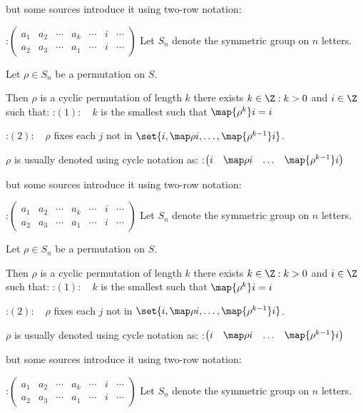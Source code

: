 but some sources introduce it using two-row notation:

:$\begin{pmatrix} a_1 & a_2 & \cdots & a_k & \cdots & i & \cdots \\ a_2 & a_3 & \cdots & a_1 & \cdots & i & \cdots \end{pmatrix}$
Let $S_n$ denote the symmetric group on $n$ letters.

Let $\rho \in S_n$ be a permutation on $S$.


Then $\rho$ is a cyclic permutation of length $k$  there exists $k \in \Z: k > 0$ and $i \in \Z$ such that:
:$(1): \quad k$ is the smallest such that $\map {\rho^k} i = i$

:$(2): \quad \rho$ fixes each $j$ not in $\set {i, \map \rho i, \ldots, \map {\rho^{k - 1} } i}$.


$\rho$ is usually denoted using cycle notation as:
:$\begin{pmatrix} i & \map \rho i & \ldots & \map {\rho^{k - 1} } i \end{pmatrix}$

but some sources introduce it using two-row notation:

:$\begin{pmatrix} a_1 & a_2 & \cdots & a_k & \cdots & i & \cdots \\ a_2 & a_3 & \cdots & a_1 & \cdots & i & \cdots \end{pmatrix}$
Let $S_n$ denote the symmetric group on $n$ letters.

Let $\rho \in S_n$ be a permutation on $S$.


Then $\rho$ is a cyclic permutation of length $k$  there exists $k \in \Z: k > 0$ and $i \in \Z$ such that:
:$(1): \quad k$ is the smallest such that $\map {\rho^k} i = i$

:$(2): \quad \rho$ fixes each $j$ not in $\set {i, \map \rho i, \ldots, \map {\rho^{k - 1} } i}$.


$\rho$ is usually denoted using cycle notation as:
:$\begin{pmatrix} i & \map \rho i & \ldots & \map {\rho^{k - 1} } i \end{pmatrix}$

but some sources introduce it using two-row notation:

:$\begin{pmatrix} a_1 & a_2 & \cdots & a_k & \cdots & i & \cdots \\ a_2 & a_3 & \cdots & a_1 & \cdots & i & \cdots \end{pmatrix}$
Let $S_n$ denote the symmetric group on $n$ letters.

